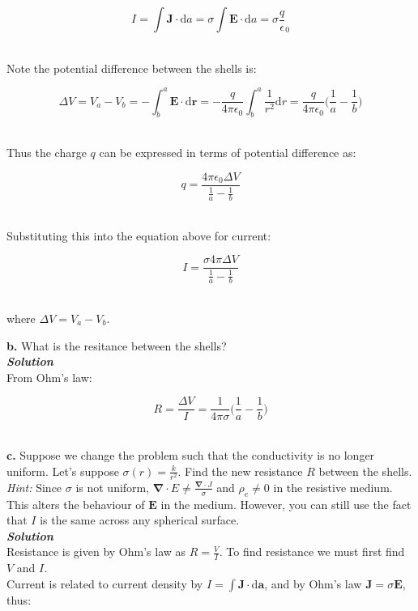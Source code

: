 \documentclass[9pt]{extarticle}
\renewcommand{\v}[1]{{\bm #1}}
\newcommand{\bfit}[1]{\textbf{\textit{#1}}}
\renewcommand{\d}{\text{d}}
\renewcommand{\div}{\boldsymbol \nabla \cdot}
\newcommand{\eo}{\epsilon_0}
\begin{document}
\begin{multicols*}{2}
$$I = \int \v J \cdot \d a = \sigma \int \v E \cdot \d a = \sigma \frac q\eo$$ \ 

Note the potential difference between the shells is:

$$\Delta V = V_a - V_b = -\int_b^a \v E \cdot \d \v r = -\frac{q}{4\pi\eo} \int_b^a \frac{1}{r^2} \d r = \frac{q}{4\pi\eo} \bigg( \frac 1a - \frac 1b \bigg)$$ \ 

Thus the charge $q$ can be expressed in terms of potential difference as:

$$q = \frac{4\pi\eo \Delta V}{\frac 1a - \frac 1b}$$ \ 

Substituting this into the equation above for current:

$$I = \frac{\sigma 4\pi \Delta V}{\frac 1a  - \frac 1b}$$ \ 

where $\Delta V = V_a - V_b$. \\  



\dotfill 

\hfill 

{\Large \bf b.} What is the resitance between the shells? \\ 

{\bfit{Solution}} \\ 

From Ohm's law:

$$R = \frac{\Delta V}{I} = \frac{1}{4\pi\sigma} \bigg( \frac 1a - \frac 1b \bigg)$$ \ 



\dotfill 

\hfill 

{\Large \bf c.} Suppose we change the problem such that the conductivity is no longer uniform. Let's suppose $\sigma(r) = \frac{k}{r^2}$. Find the new resistance $R$ between the shells. {\it Hint:} Since $\sigma$ is not uniform, $\div E \neq \frac{\div J}{\sigma}$ and $\rho_e \neq 0$ in the resistive medium. This alters the behaviour of $\v E$ in the medium. However, you can still use the fact that $I$ is the same across any spherical surface. \\  

{\bfit{Solution}} \\ 

Resistance is given by Ohm's law as $R = \frac VI$. To find resistance we must first find $V$ and $I$. \\ 

Current is related to current density by $I  = \int \v J \cdot \d \v a$, and by Ohm's law $\v J = \sigma \v E$, thus:


\end{multicols*}
\end{document}
